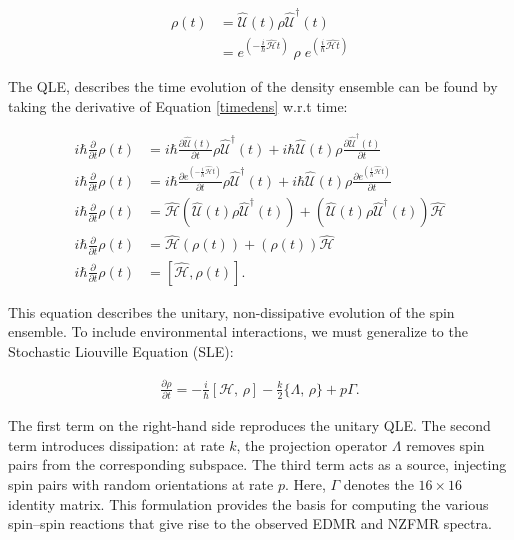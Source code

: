 \documentclass[svgnames]{article}
\begin{document}
\begin{align}\label{timedens}
    \rho(t) &= \hat{\mathcal{U}}(t) \rho \hat{\mathcal{U}}^\dagger (t) \\
                  &= e^{\left( -\frac{i}{\hbar}\hat{\mathcal{H} }t
                  \right) } \;\rho\; e^{\left(
                      \frac{i}{\hbar}\hat{\mathcal{H} t} \right)  }   
\end{align}

The QLE, describes the time evolution of the density
ensemble can be found by taking the derivative of Equation \ref{timedens} w.r.t
time: 

\begin{align} \label{}
    i\hbar \frac{\partial }{\partial t} \rho(t) 
    &= i\hbar \frac{\partial
    \hat{\mathcal{U} }(t)}{\partial t} \rho \hat{\mathcal{U} }^\dagger(t) + i\hbar
    \hat{\mathcal{U} }(t) \rho \frac{\partial \hat{\mathcal{U} }^\dagger(t)}{\partial t}
    \\
    i\hbar \frac{\partial }{\partial t} \rho(t) &= i\hbar \frac{\partial
    e^{\left( -\frac{i}{\hbar}\hat{\mathcal{H}}t\right)  }}{\partial t} \rho
    \hat{\mathcal{U} }^\dagger (t) + i\hbar \hat{\mathcal{U} }(t) \rho
    \frac{\partial e^{\left( \frac{i}{\hbar}\hat{\mathcal{H} }t \right)
    }}{\partial t}\\ 
    i\hbar \frac{\partial }{\partial t} \rho(t) &= \hat{\mathcal{H} }\left(
    \hat{\mathcal{U} }(t) \rho \hat{\mathcal{U} }^\dagger (t) \right) + \left(
\hat{\mathcal{U} }(t) \rho \hat{\mathcal{U} }^\dagger (t) \right)
\hat{\mathcal{H} } \\  
        i\hbar \frac{\partial }{\partial t} \rho(t) &= \hat{\mathcal{H}
        }(\rho(t)) + (\rho(t)) \hat{\mathcal{H} } \\ 
        i\hbar \frac{\partial }{\partial t} \rho(t) &= \left[ \hat{\mathcal{H} },
        \rho(t) \right].
\end{align}

This equation describes the unitary, non-dissipative evolution of the spin ensemble.
To include environmental interactions, we must generalize to the Stochastic Liouville
Equation (SLE): 

\begin{align} \label{sle}
    \frac{\partial \rho}{\partial t} = -\frac{i}{\hbar}[\mathcal{H}, \,\rho] -
    \frac{k}{2}\{ \Lambda, \,\rho \} + p\Gamma. 
\end{align}

The first term on the right-hand side reproduces the unitary QLE.  
The second term introduces dissipation: at rate $k$, the projection operator
$\Lambda$ removes spin pairs from the corresponding subspace.  
The third term acts as a source, injecting spin pairs with random orientations
at rate $p$.  Here, $\Gamma$ denotes the $16\times16$ identity matrix.  This
formulation provides the basis for computing the various spin–spin reactions
that give rise to the observed EDMR and NZFMR spectra. \\
\end{document}

